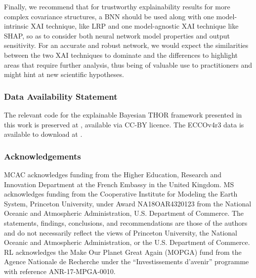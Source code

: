 \documentclass[a4paper]{article}
\begin{document}
Finally, we recommend that for trustworthy explainability results for more complex covariance structures, a BNN should be used along with one model-intrinsic XAI technique, like LRP and one model-agnostic XAI technique like SHAP, so as to consider both neural network model properties and output sensitivity. For an accurate and robust network, we would expect the similarities between the two XAI techniques to dominate and the differences to highlight areas that require further analysis, thus being of valuable use to practitioners and might hint at new scientific hypotheses. 

\subsubsection*{Data Availability Statement}
	The relevant code for the explainable Bayesian THOR framework presented in this work is preserved at \cite{THOR_code}, available via CC-BY licence. The ECCOv4r3 data is available to download at \cite{ECCO_data}.

\subsubsection*{Acknowledgements}
MCAC acknowledges funding from the Higher Education, Research and Innovation Department at the French Embassy in the United Kingdom. MS acknowledges funding from the Cooperative Institute for Modeling the Earth System, Princeton University, under Award NA18OAR4320123 from the National Oceanic and Atmospheric Administration, U.S. Department of Commerce. The statements, findings, conclusions, and recommendations are those of the authors and do not necessarily reflect the views of Princeton University, the National Oceanic and Atmospheric Administration, or the U.S. Department of Commerce. RL acknowledges the Make Our Planet Great Again (MOPGA) fund from the Agence Nationale de Recherche under the ``Investissements d'avenir'' programme with reference ANR-17-MPGA-0010.

\appendix
\end{document}
